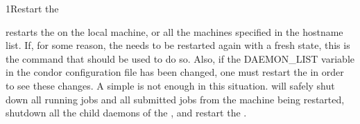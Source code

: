 \begin{ManPage}{}{1}{Restart the }
\label{man-condor-restart}
\Synopsis {}

\Description 

 restarts the  on the local machine, or all the
machines specified in the hostname list.  If, for some reason, the
 needs to be restarted again with a fresh state, this is the
command that should be used to do so.  Also, if the DAEMON\_LIST variable in
the condor configuration file has been changed, one must restart the
 in order to see these changes.  A simple 
is not enough in this situation.   will safely shut down
all running jobs and all submitted jobs from the machine being restarted,
shutdown all the child daemons of the , and restart the
.

\begin{Options}
\end{Options}

\end{ManPage}
